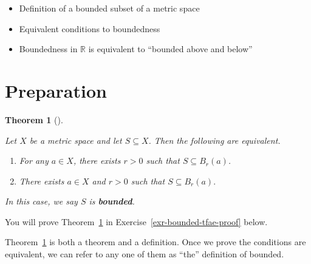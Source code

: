 \documentclass[
  letterpaper,
  DIV=11,
  numbers=noendperiod]{scrreprt}
\providecommand{\tightlist}{%
  \setlength{\itemsep}{0pt}\setlength{\parskip}{0pt}}
\def\R{\mathbb R}
\theoremstyle{plain}
\newtheorem{theorem}{Theorem}[chapter]
\theoremstyle{definition}
\theoremstyle{plain}
\theoremstyle{plain}
\theoremstyle{definition}
\theoremstyle{definition}
\theoremstyle{remark}
\begin{document}

\begin{itemize}
\tightlist
\item
  Definition of a bounded subset of a metric space
\item
  Equivalent conditions to boundedness
\item
  Boundedness in \(\R\) is equivalent to ``bounded above and below''
\end{itemize}

\section{Preparation}\label{preparation-7}

\begin{theorem}[]\protect\hypertarget{thm-bounded}{}\label{thm-bounded}

Let \(X\) be a metric space and let \(S\subseteq X\). Then the following
are equivalent.

\begin{enumerate}
\def\labelenumi{\arabic{enumi}.}
\tightlist
\item
  For any \(a\in X\), there exists \(r>0\) such that
  \(S\subseteq B_r(a)\).
\item
  There exists \(a\in X\) and \(r>0\) such that \(S\subseteq B_r(a).\)
\end{enumerate}

In this case, we say \(S\) is \textbf{bounded}.

\end{theorem}

You will prove Theorem~\ref{thm-bounded} in
Exercise~\ref{exr-bounded-tfae-proof} below.

\begin{tcolorbox}[enhanced jigsaw, titlerule=0mm, opacitybacktitle=0.6, leftrule=.75mm, bottomrule=.15mm, left=2mm, arc=.35mm, colback=white, rightrule=.15mm, colframe=quarto-callout-note-color-frame, toptitle=1mm, breakable, opacityback=0, colbacktitle=quarto-callout-note-color!10!white, bottomtitle=1mm, title=\textcolor{quarto-callout-note-color}{\faInfo}\hspace{0.5em}{Note}, coltitle=black, toprule=.15mm]

Theorem~\ref{thm-bounded} is both a theorem and a definition. Once we
prove the conditions are equivalent, we can refer to any one of them as
``the'' definition of bounded.

\end{tcolorbox}
\end{document}
